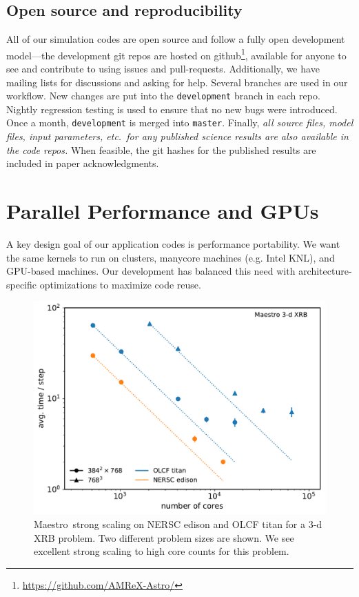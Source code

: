 \documentclass[a4paper]{jpconf}
\newcommand{\maestro}{{\sffamily Maestro}}
\begin{document}
\subsection{Open source and reproducibility}

All of our simulation codes are open source and follow a fully open
development model---the development git repos are hosted on
github\footnote{\url{https://github.com/AMReX-Astro/}}, available for
anyone to see and contribute to using issues and pull-requests.
Additionally, we have mailing lists for discussions and asking for
help.  Several branches are used in our workflow.  New changes are put
into the {\tt development} branch in each repo.  Nightly regression
testing is used to ensure that no new bugs were introduced.  Once a
month, {\tt development} is merged into {\tt master}.  Finally, {\em all source
  files, model files, input parameters, etc.\ for any published
  science results are also available in the code repos.}  When
feasible, the git hashes for the published results are included in
paper acknowledgments.




\section{Parallel Performance and GPUs}


A key design goal of our application codes is performance portability.
We want the same kernels to run on clusters, manycore machines (e.g.
Intel KNL), and GPU-based machines.  Our development has balanced this
need with architecture-specific optimizations to maximize code reuse.

\begin{figure}[t]
\centering
\includegraphics[width=0.48\linewidth]{titan_edison_maestro_scaling}
\begin{minipage}[b]{0.48\linewidth}
\caption{\label{fig:maestro_scaling} \maestro\ strong scaling on NERSC
  edison and OLCF titan for a 3-d XRB problem.  Two different problem
  sizes are shown.  We see excellent strong scaling to high core counts
  for this problem.\vspace{2em}}
\end{minipage}
\end{figure}
\end{document}
